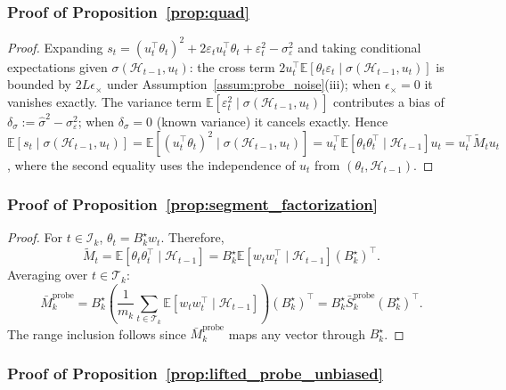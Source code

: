 \documentclass{article}
\newcommand{\E}{\mathbb{E}}
\newcommand{\cH}{\mathcal{H}}
\begin{document}
\subsubsection{Proof of Proposition~\ref{prop:quad}}
\label{proof:quad}

\begin{proof}
Expanding $s_t = (u_t^\top \theta_t)^2 + 2\varepsilon_t u_t^\top \theta_t + \varepsilon_t^2 - \sigma_\varepsilon^2$ and taking conditional expectations given $\sigma(\cH_{t-1},u_t)$:
the cross term $2u_t^\top \E[\theta_t\varepsilon_t \mid \sigma(\cH_{t-1},u_t)]$ is bounded by $2L\epsilon_\times$ under Assumption~\ref{assum:probe_noise}(iii); when $\epsilon_\times = 0$ it vanishes exactly. The variance term $\E[\varepsilon_t^2 \mid \sigma(\cH_{t-1},u_t)]$ contributes a bias of $\delta_\sigma := \hat\sigma^2 - \sigma_\varepsilon^2$; when $\delta_\sigma = 0$ (known variance) it cancels exactly.
Hence $\E[s_t \mid \sigma(\cH_{t-1},u_t)] = \E[(u_t^\top \theta_t)^2 \mid \sigma(\cH_{t-1},u_t)] = u_t^\top \E[\theta_t\theta_t^\top \mid \cH_{t-1}] u_t = u_t^\top \widetilde M_t u_t$,
where the second equality uses the independence of $u_t$ from $(\theta_t, \cH_{t-1})$.
\end{proof}

\subsubsection{Proof of Proposition~\ref{prop:segment_factorization}}
\label{proof:segment_factorization}

\begin{proof}
For $t\in \mathcal I_k$, $\theta_t = B_k^\star w_t$. Therefore,
\[
\widetilde M_t
=
\E[\theta_t\theta_t^\top \mid \mathcal H_{t-1}]
=
B_k^\star \E[w_t w_t^\top \mid \mathcal H_{t-1}] (B_k^\star)^\top.
\]
Averaging over $t\in\mathcal T_k$:
\[
\bar M_k^{\mathrm{probe}}
=
B_k^\star
\!\left(
\frac{1}{m_k}\sum_{t\in \mathcal T_k}\E[w_t w_t^\top \mid \mathcal H_{t-1}]
\right)
(B_k^\star)^\top
=
B_k^\star \bar S_k^{\mathrm{probe}} (B_k^\star)^\top.
\]
The range inclusion follows since $\bar M_k^{\mathrm{probe}}$ maps any vector through $B_k^\star$.
\end{proof}

\subsubsection{Proof of Proposition~\ref{prop:lifted_probe_unbiased}}
\label{proof:lifted_probe_unbiased}
\end{document}

